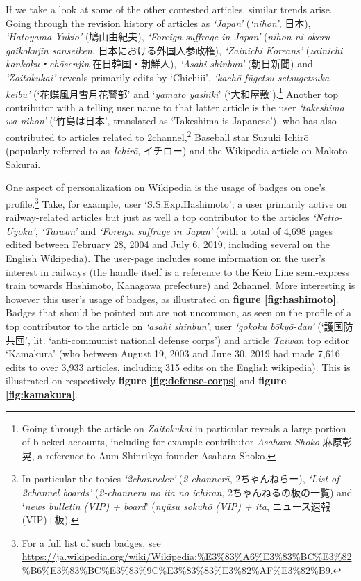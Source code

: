 \documentclass[10pt,british,A4paper,,openany]{memoir}
\begin{document}
If we take a look at some of the other contested articles, similar
trends arise. Going through the revision history of articles as
\emph{`Japan'} (\emph{`nihon'}, 日本), \emph{`Hatoyama Yukio'}
(鳩山由紀夫), \emph{`Foreign suffrage in Japan'} (\emph{nihon ni okeru
gaikokujin sanseiken}, 日本における外国人参政権), \emph{`Zainichi
Koreans'} (\emph{zainichi kankoku・chōsenjin} 在日韓国・朝鮮人),
\emph{`Asahi shinbun'} (朝日新聞) and \emph{`Zaitokukai'} reveals
primarily edits by `Chichiii', \emph{`kachō fūgetsu setsugetsuka keibu'}
(`花蝶風月雪月花警部' and `\emph{yamato yashiki}'
(`大和屋敷').\footnote{Going through the article on \emph{Zaitokukai} in
  particular reveals a large portion of blocked accounts, including for
  example contributor \emph{Asahara Shoko} 麻原彰晃, a reference to Aum
  Shinrikyo founder Asahara Shoko.} Another top contributor with a
telling user name to that latter article is the user \emph{`takeshima wa
nihon'} (`竹島は日本', translated as `Takeshima is Japanese'), who has
also contributed to articles related to 2channel,\footnote{In particular
  the topics \emph{`2channeler'} (\emph{2-channerā}, 2ちゃんねらー),
  \emph{`List of 2channel boards'} (\emph{2-channeru no ita no ichiran},
  2ちゃんねるの板の一覧) and `\emph{news bulletin (VIP) + board}'
  (\emph{nyūsu sokuhō (VIP) + ita}, ニュース速報(VIP)+板).} Baseball
star Suzuki Ichirō (popularly referred to as \emph{Ichirō}, イチロー)
and the Wikipedia article on Makoto Sakurai.

One aspect of personalization on Wikipedia is the usage of badges on
one's profile.\footnote{For a full list of such badges, see
  \url{https://ja.wikipedia.org/wiki/Wikipedia:\%E3\%83\%A6\%E3\%83\%BC\%E3\%82\%B6\%E3\%83\%BC\%E3\%83\%9C\%E3\%83\%83\%E3\%82\%AF\%E3\%82\%B9}.}
Take, for example, user `S.S.Exp.Hashimoto'; a user primarily active on
railway-related articles but just as well a top contributor to the
articles \emph{`Netto-Uyoku'}, \emph{`Taiwan'} and \emph{`Foreign
suffrage in Japan'} (with a total of 4,698 pages edited between February
28, 2004 and July 6, 2019, including several on the English Wikipedia).
The user-page includes some information on the user's interest in
railways (the handle itself is a reference to the Keio Line semi-express
train towards Hashimoto, Kanagawa prefecture) and 2channel. More
interesting is however this user's usage of badges, as illustrated on
\textbf{figure \ref{fig:hashimoto}}. Badges that should be pointed out
are not uncommon, as seen on the profile of a top contributor to the
article on \emph{`asahi shinbun'}, user \emph{`gokoku bōkyō-dan'}
(`護国防共団', lit. `anti-communist national defense corps') and article
\emph{Taiwan} top editor `Kamakura' (who between August 19, 2003 and
June 30, 2019 had made 7,616 edits to over 3,933 articles, including 315
edits on the English wikipedia). This is illustrated on respectively
\textbf{figure \ref{fig:defense-corps}} and \textbf{figure
\ref{fig:kamakura}}.
\end{document}

